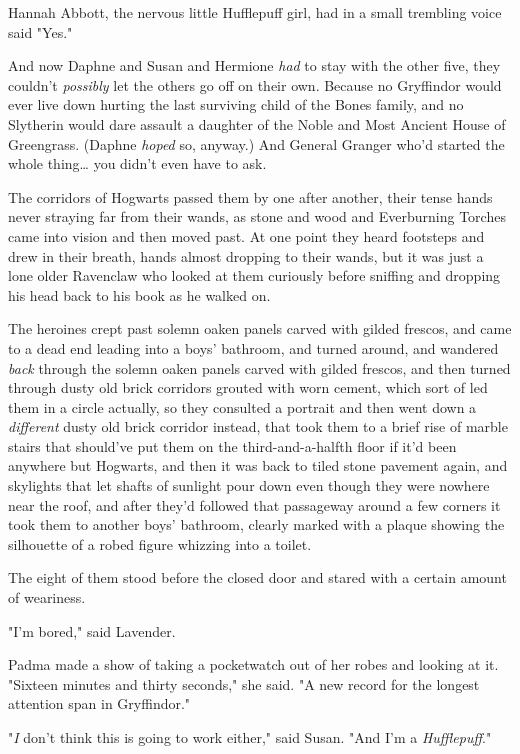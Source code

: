 Hannah Abbott, the nervous little Hufflepuff girl, had in a small trembling 
voice said "Yes."

And now Daphne and Susan and Hermione \emph{had} to stay with the other five, 
they couldn't \emph{possibly} let the others go off on their own. Because no 
Gryffindor would ever live down hurting the last surviving child of the Bones 
family, and no Slytherin would dare assault a daughter of the Noble and Most 
Ancient House of Greengrass. (Daphne \emph{hoped} so, anyway.) And General 
Granger who'd started the whole thing{\ldots} you didn't even have to ask.

The corridors of Hogwarts passed them by one after another, their tense hands 
never straying far from their wands, as stone and wood and Everburning Torches 
came into vision and then moved past. At one point they heard footsteps and 
drew in their breath, hands almost dropping to their wands, but it was just a 
lone older Ravenclaw who looked at them curiously before sniffing and dropping 
his head back to his book as he walked on.

The heroines crept past solemn oaken panels carved with gilded frescos, and 
came to a dead end leading into a boys' bathroom, and turned around, and 
wandered \emph{back} through the solemn oaken panels carved with gilded 
frescos, and then turned through dusty old brick corridors grouted with worn 
cement, which sort of led them in a circle actually, so they consulted a 
portrait and then went down a \emph{different} dusty old brick corridor 
instead, that took them to a brief rise of marble stairs that should've put 
them on the third-and-a-halfth floor if it'd been anywhere but Hogwarts, and 
then it was back to tiled stone pavement again, and skylights that let shafts 
of sunlight pour down even though they were nowhere near the roof, and after 
they'd followed that passageway around a few corners it took them to another 
boys' bathroom, clearly marked with a plaque showing the silhouette of a robed 
figure whizzing into a toilet.

The eight of them stood before the closed door and stared with a certain amount 
of weariness.

"I'm bored," said Lavender.

Padma made a show of taking a pocketwatch out of her robes and looking at it. 
"Sixteen minutes and thirty seconds," she said. "A new record for the longest 
attention span in Gryffindor."

"\emph{I} don't think this is going to work either," said Susan. "And I'm a 
\emph{Hufflepuff}."

